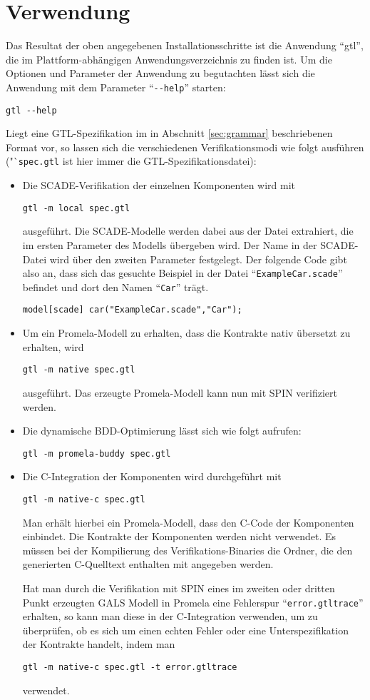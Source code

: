 \section{Verwendung}
Das Resultat der oben angegebenen Installationsschritte ist die Anwendung "`gtl"', die im Plattform-abhängigen Anwendungsverzeichnis zu finden ist.
Um die Optionen und Parameter der Anwendung zu begutachten lässt sich die Anwendung mit dem Parameter "`\verb|--help|"' starten:
\begin{verbatim}
gtl --help
\end{verbatim}
Liegt eine GTL-Spezifikation im in Abschnitt \ref{sec:grammar} beschriebenen Format vor, so lassen sich die verschiedenen Verifikationsmodi wie folgt ausführen ("`\verb|spec.gtl| ist hier immer die GTL-Spezifikationsdatei):
\begin{itemize}
\item Die SCADE-Verifikation der einzelnen Komponenten wird mit
\begin{verbatim}
gtl -m local spec.gtl
\end{verbatim}
ausgeführt.
Die SCADE-Modelle werden dabei aus der Datei extrahiert, die im ersten Parameter des Modells übergeben wird.
Der Name in der SCADE-Datei wird über den zweiten Parameter festgelegt.
Der folgende Code gibt also an, dass sich das gesuchte Beispiel in der Datei "`\verb|ExampleCar.scade|"' befindet und dort den Namen "`\verb|Car|"' trägt.
\begin{lstlisting}[language=gtl]
model[scade] car("ExampleCar.scade","Car");
\end{lstlisting}
\item Um ein Promela-Modell zu erhalten, dass die Kontrakte nativ übersetzt zu erhalten, wird
\begin{verbatim}
gtl -m native spec.gtl
\end{verbatim}
ausgeführt.
Das erzeugte Promela-Modell kann nun mit SPIN verifiziert werden.
\item Die dynamische BDD-Optimierung lässt sich wie folgt aufrufen:
\begin{verbatim}
gtl -m promela-buddy spec.gtl
\end{verbatim}
\item Die C-Integration der Komponenten wird durchgeführt mit
\begin{verbatim}
gtl -m native-c spec.gtl
\end{verbatim}
Man erhält hierbei ein Promela-Modell, dass den C-Code der Komponenten einbindet.
Die Kontrakte der Komponenten werden nicht verwendet.
Es müssen bei der Kompilierung des Verifikations-Binaries die Ordner, die den generierten C-Quelltext enthalten mit angegeben werden.


Hat man durch die Verifikation mit SPIN eines im zweiten oder dritten Punkt erzeugten GALS Modell in Promela eine Fehlerspur "`\verb|error.gtltrace|"' erhalten, so kann man diese in der C-Integration verwenden, um zu überprüfen, ob es sich um einen echten Fehler oder eine Unterspezifikation der Kontrakte handelt, indem man
\begin{verbatim}
gtl -m native-c spec.gtl -t error.gtltrace
\end{verbatim}
verwendet.
\end{itemize}
